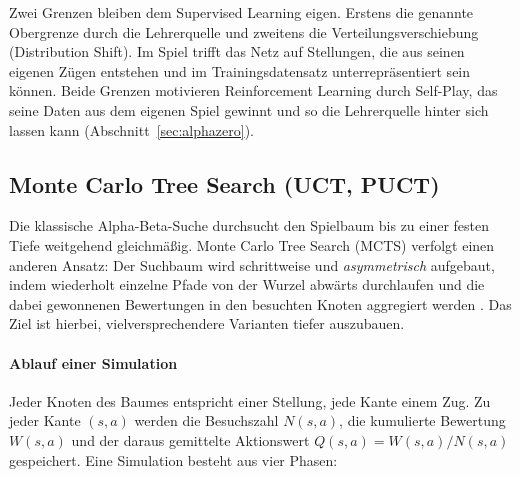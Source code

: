 \documentclass[
  a4paper, 12pt,
  parskip=half,
  headings=small,
  bibliography=totoc
]{scrartcl}
\begin{document}
Zwei Grenzen bleiben dem Supervised Learning eigen. Erstens die genannte
Obergrenze durch die Lehrerquelle und zweitens die Verteilungsverschiebung
(Distribution Shift). Im Spiel trifft das Netz auf Stellungen, die aus seinen
eigenen Zügen entstehen und im Trainingsdatensatz unterrepräsentiert sein können.
Beide Grenzen motivieren Reinforcement Learning durch Self-Play, das seine Daten
aus dem eigenen Spiel gewinnt und so die Lehrerquelle hinter sich lassen kann
(Abschnitt~\ref{sec:alphazero}).

\subsection{Monte Carlo Tree Search (UCT, PUCT)}\label{sec:mcts}                  %
Die klassische Alpha-Beta-Suche durchsucht den Spielbaum bis zu einer festen Tiefe weitgehend gleichmäßig. Monte Carlo Tree Search (MCTS) verfolgt einen anderen Ansatz: Der Suchbaum wird schrittweise und \emph{asymmetrisch} aufgebaut, indem wiederholt einzelne Pfade von der Wurzel abwärts durchlaufen und die dabei gewonnenen Bewertungen in den besuchten Knoten aggregiert werden \parencite{coulom2006efficient, klein2022neural}. Das Ziel ist hierbei, vielversprechendere Varianten tiefer auszubauen.

\paragraph{Ablauf einer Simulation}
Jeder Knoten des Baumes entspricht einer Stellung, jede Kante einem Zug. Zu jeder Kante \((s,a)\) werden die Besuchszahl \(N(s,a)\), die kumulierte Bewertung \(W(s,a)\) und der daraus gemittelte Aktionswert \(Q(s,a) = W(s,a)/N(s,a)\) gespeichert. Eine Simulation besteht aus vier Phasen:
 
\end{document}
